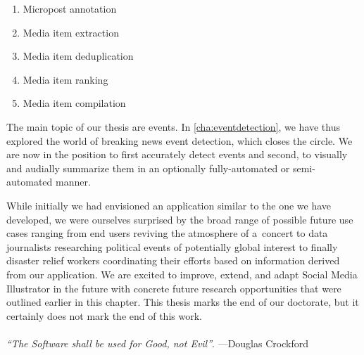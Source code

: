 \begin{enumerate}
  \item Micropost annotation
  \item Media item extraction
  \item Media item deduplication
  \item Media item ranking
  \item Media item compilation
\end{enumerate}

The main topic of our thesis are events.
In \autoref{cha:eventdetection}, we have thus 
explored the world of breaking news event detection,
which closes the circle.
We are now in the position to first accurately detect events
and second, to visually and audially summarize them
in an optionally fully-automated or semi-automated manner.

While initially we had envisioned an application
similar to the one we have developed,
we were ourselves surprised by the broad range
of possible future use cases ranging from end users
reviving the atmosphere of a~concert
to data journalists researching political events
of potentially global interest
to finally disaster relief workers coordinating 
their efforts based on information derived from our application.
We are excited to improve, extend, and adapt
Social Media Illustrator in the future
with concrete future research opportunities
that were outlined earlier in this chapter.
This thesis marks the end of our doctorate,
but it certainly does not mark the end of this work.
\\
\\
\textit{``The Software shall be used for Good, not Evil''}.%
---Douglas Crockford